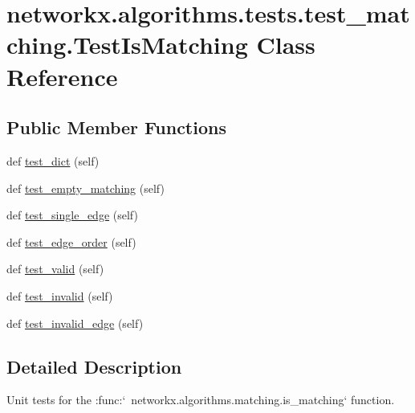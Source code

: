 \hypertarget{classnetworkx_1_1algorithms_1_1tests_1_1test__matching_1_1TestIsMatching}{}\section{networkx.\+algorithms.\+tests.\+test\+\_\+matching.\+Test\+Is\+Matching Class Reference}
\label{classnetworkx_1_1algorithms_1_1tests_1_1test__matching_1_1TestIsMatching}
\subsection*{Public Member Functions}
\begin{DoxyCompactItemize}
\item 
def \hyperlink{classnetworkx_1_1algorithms_1_1tests_1_1test__matching_1_1TestIsMatching_ac26daef2005dfa42d20e3ea2dd6148d6}{test\+\_\+dict} (self)
\item 
def \hyperlink{classnetworkx_1_1algorithms_1_1tests_1_1test__matching_1_1TestIsMatching_aec968181bfc5fb6f873104920bf7f890}{test\+\_\+empty\+\_\+matching} (self)
\item 
def \hyperlink{classnetworkx_1_1algorithms_1_1tests_1_1test__matching_1_1TestIsMatching_acd15a81ff6ab9b99d686534a25303231}{test\+\_\+single\+\_\+edge} (self)
\item 
def \hyperlink{classnetworkx_1_1algorithms_1_1tests_1_1test__matching_1_1TestIsMatching_a3a07271ccefcedf7389b21feb3e3fb6b}{test\+\_\+edge\+\_\+order} (self)
\item 
def \hyperlink{classnetworkx_1_1algorithms_1_1tests_1_1test__matching_1_1TestIsMatching_a9d71fe8536aedf72ff35187c583ffcaa}{test\+\_\+valid} (self)
\item 
def \hyperlink{classnetworkx_1_1algorithms_1_1tests_1_1test__matching_1_1TestIsMatching_acae2fc2b007ec9c198e56cca2d737e28}{test\+\_\+invalid} (self)
\item 
def \hyperlink{classnetworkx_1_1algorithms_1_1tests_1_1test__matching_1_1TestIsMatching_a1ebbec5b59b10ea05b1ffcecb7fb28e4}{test\+\_\+invalid\+\_\+edge} (self)
\end{DoxyCompactItemize}


\subsection{Detailed Description}
\begin{DoxyVerb}Unit tests for the
:func:`~networkx.algorithms.matching.is_matching` function.\end{DoxyVerb}
 

